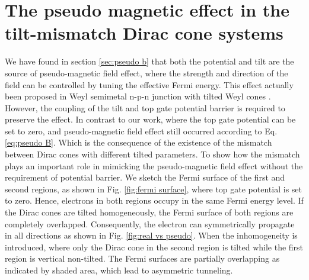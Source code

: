 \section{The pseudo magnetic effect in the tilt-mismatch Dirac cone systems}
    We have found in section \ref{sec:pseudo b} that both the potential and tilt are the source of pseudo-magnetic field effect, where the strength and direction of the field can be controlled by tuning the effective Fermi energy.
    This effect actually been proposed in Weyl semimetal n-p-n junction with tilted Weyl cones \cite{Yesilyurt2017a}.
    However, the coupling of the tilt and top gate potential barrier is required to preserve the effect. In contrast to our work, where the top gate potential can be set to zero, and pseudo-magnetic field effect still occurred according to Eq. \ref{eq:pseudo B}.
    Which is the consequence of the existence of the mismatch between Dirac cones with different tilted parameters. 
    To show how the mismatch plays an important role in mimicking the pseudo-magnetic field effect without the requirement of potential barrier. 
    We sketch the Fermi surface of the first and second regions, as shown in Fig. \ref{fig:fermi surface}, where top gate potential is set to zero. 
    Hence, electrons in both regions occupy in the same Fermi energy level. 
    If the Dirac cones are tilted homogeneously, the Fermi surface of both regions are completely overlapped. 
    Consequently, the electron can symmetrically propagate in all directions as shown in Fig. \ref{fig:real vs pseudo}. 
    When the inhomogeneity is introduced, where only the Dirac cone in the second region is tilted while the first region is vertical non-tilted. 
    The Fermi surfaces are partially overlapping as indicated by shaded area, which lead to asymmetric tunneling.
    
